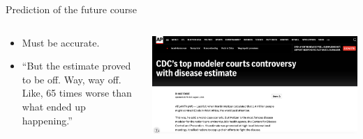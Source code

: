 \documentclass[
  ignorenonframetext,
]{beamer}
\providecommand{\tightlist}{%
  \setlength{\itemsep}{0pt}\setlength{\parskip}{0pt}}\usepackage{longtable,booktabs,array}
\begin{document}
\begin{frame}
\begin{block}{Prediction of the future course}
\label{prediction-of-the-future-course}
\begin{columns}[T]
\begin{column}{0.4\textwidth}
\begin{itemize}
\tightlist
\item
  Must be {accurate}.
\item
  ``But the estimate proved to be off. Way, way off. Like, 65 times
  worse than what ended up happening.''
\end{itemize}
\end{column}

\begin{column}{0.6\textwidth}
\includegraphics{images/wrong_ebola_deaths_estimate.png}
\end{column}
\end{columns}
\end{block}
\end{frame}
\end{document}
